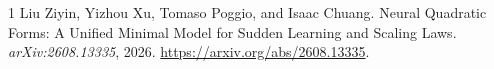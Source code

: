 \documentclass[11pt]{article}
\begin{document}
\begin{thebibliography}{1}
Liu Ziyin, Yizhou Xu, Tomaso Poggio, and Isaac Chuang.
\newblock Neural Quadratic Forms: A Unified Minimal Model for Sudden Learning
and Scaling Laws.
\newblock \emph{arXiv:2608.13335}, 2026.
\newblock \url{https://arxiv.org/abs/2608.13335}.
\end{thebibliography}
\end{document}
